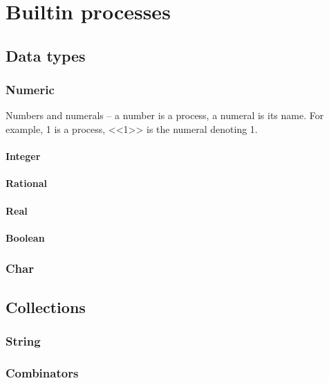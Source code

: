 \section{Builtin processes}

\subsection{Data types}

\subsubsection{Numeric}

Numbers and numerals -- a number is a process, a numeral is its
name. For example, 1 is a process, <<1>> is the numeral denoting 1.

\paragraph{Integer}


\paragraph{Rational}

\paragraph{Real}

\paragraph{Boolean}

\subsubsection{Char}

\subsection{Collections}

\subsubsection{String}

\subsubsection{Combinators}


